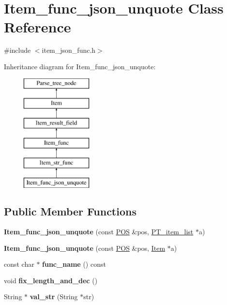 \hypertarget{classItem__func__json__unquote}{}\section{Item\+\_\+func\+\_\+json\+\_\+unquote Class Reference}
\label{classItem__func__json__unquote}


{\ttfamily \#include $<$item\+\_\+json\+\_\+func.\+h$>$}

Inheritance diagram for Item\+\_\+func\+\_\+json\+\_\+unquote\+:\begin{figure}[H]
\begin{center}
\leavevmode
\includegraphics[height=6.000000cm]{classItem__func__json__unquote}
\end{center}
\end{figure}
\subsection*{Public Member Functions}
\begin{DoxyCompactItemize}
\item 
\mbox{\label{classItem__func__json__unquote_a507e7f26ad7b3d86f0277f686fc1046f}} 
{\bfseries Item\+\_\+func\+\_\+json\+\_\+unquote} (const \mbox{\hyperlink{structYYLTYPE}{P\+OS}} \&pos, \mbox{\hyperlink{classPT__item__list}{P\+T\+\_\+item\+\_\+list}} $\ast$a)
\item 
\mbox{\label{classItem__func__json__unquote_a4fbeafedfa152a36058f1a594f471e9f}} 
{\bfseries Item\+\_\+func\+\_\+json\+\_\+unquote} (const \mbox{\hyperlink{structYYLTYPE}{P\+OS}} \&pos, \mbox{\hyperlink{classItem}{Item}} $\ast$a)
\item 
\mbox{\label{classItem__func__json__unquote_a4682cf8a5f7b4655184d665ad61155b1}} 
const char $\ast$ {\bfseries func\+\_\+name} () const
\item 
\mbox{\label{classItem__func__json__unquote_a8c9a45a1517546e3362cd7a717c55e0a}} 
void {\bfseries fix\+\_\+length\+\_\+and\+\_\+dec} ()
\item 
\mbox{\label{classItem__func__json__unquote_a51ea7336e314a4cf5de9a910d1d752d4}} 
String $\ast$ {\bfseries val\+\_\+str} (String $\ast$str)
\end{DoxyCompactItemize}
